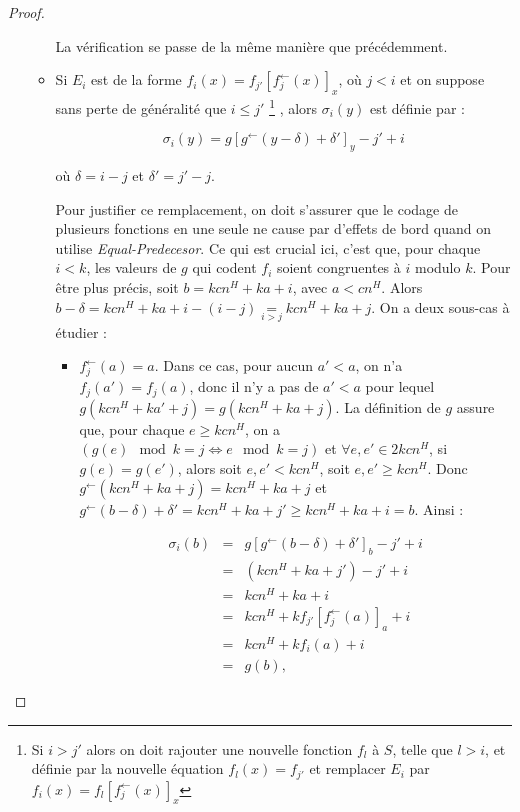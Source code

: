\documentclass{article}
\newcommand{\eqpred}[3]{#1\left[ #2^{\leftarrow}(#3) \right]_{#3}}
\newcommand{\eqpredfi}[5]{#1\left[ #2^{\leftarrow}(#3) #4 \right]_{#5}} %
\begin{document}
\begin{proof}
\begin{enumerate}[itemsep=-1mm,leftmargin=2cm]
\begin{itemize}[itemsep=-1mm, leftmargin=1cm]
							La vérification se passe de la même manière que précédemment.
							
						\item
							Si $E_i$ est de la forme $f_i(x) = \eqpred{f_{j'}}{f_j}{x}$, où $j < i$ et on suppose sans perte de généralité que $i \leqslant j'$ 
								\footnote{Si $i > j'$ alors on doit rajouter une nouvelle fonction $f_l$ à $S$, telle que $l > i$, et définie par la nouvelle équation $f_l(x) = f_{j'}$ et remplacer $E_i$ par $f_i(x) = \eqpred{f_{l}}{f_j}{x}$}
							, alors $\sigma_i(y)$ est définie par :
							
							\[
								\sigma_i(y) = \eqpredfi{g}{g}{y-\delta}{ + \delta'}{y} - j' + i
							\]
							
							où $\delta = i - j$ et $\delta' = j' - j$.
							
							Pour justifier ce remplacement, on doit s'assurer que le codage de plusieurs fonctions en une seule ne cause par d'effets de bord quand on utilise \emph{Equal-Predecesor}. Ce qui est crucial ici, c'est que, pour chaque $i<k$, les valeurs de $g$ qui codent $f_i$ soient congruentes à $i$ modulo $k$. Pour être plus précis, soit $b = kcn^H + ka + i$, avec $a< cn^H$. Alors $b-\delta = kcn^H + ka + i - (i - j) \underset{i>j}{=} kcn^H + ka + j$. On a deux sous-cas à étudier :
							
							\begin{itemize}[itemsep=-1mm,leftmargin=1cm]
								\item
									$f_j^{\leftarrow}(a) = a$.   Dans ce cas, pour aucun $a' < a$, on n'a $f_j(a') = f_j(a)$, donc il n'y a pas de $a' < a$ pour lequel $g\left( kcn^H + ka' + j \right) = g\left( kcn^H + ka + j \right)$. La définition de $g$ assure que, pour chaque $e \geqslant kcn^H$, on a $\left(g(e) \mod{k} = j \Leftrightarrow e \mod{k} = j\right)$ et $\forall e, e' \in 2kcn^H$, si $g(e) = g(e')$, alors soit $e, e' < kcn^H$, soit $e, e' \geqslant kcn^H$. Donc $g^{\leftarrow} \left( kcn^H + ka + j \right) = kcn^H + ka + j$ et $g^{\leftarrow}\left( b - \delta \right) + \delta' = kcn^H + ka + j' \geqslant kcn^H + ka + i = b$. Ainsi :
									
									\setcounter{equation}{0}
									\begin{eqnarray}
										\sigma_i(b) 	& = &	\eqpredfi{g}{g}{b-\delta}{+\delta'}{b} - j' + i \\
														& = & 	\left( kcn^H + ka + j' \right) - j' + i \\
														& = & 	kcn^H + ka + i \\
														& = & 	kcn^H + k \eqpred{f_{j'}}{f_j}{a} + i \\
														& = & 	kcn^H + k f_i(a) + i \\
														& = & 	g(b),
									\end{eqnarray}
									

\end{itemize}
\end{itemize}
\end{enumerate}
\end{proof}
\end{document}
